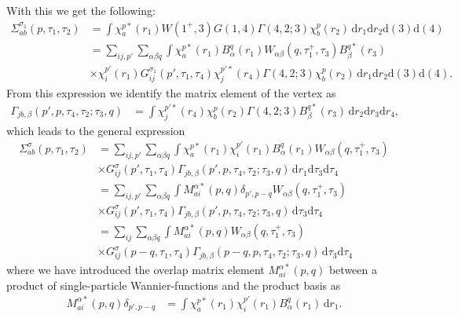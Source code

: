 \documentclass[12pt,a4paper]{scrartcl}
\numberwithin{equation}{section}
\begin{document}
With this we get the following:
\begin{align}
\Sigma^{\sigma_1}_{ab}(p,\tau_1,\tau_2)
&= \int \chi^{p*}_{a}(r_1) W(1^+,3) G(1,4) \Gamma(4,2;3) \chi^p_{b}(r_2) 
                                             \,\mathrm{d}r_1\mathrm{d}r_2 \mathrm{d}(3)\mathrm{d}(4) \\
%
&= \sum_{ij,p'}\sum_{\alpha\beta q}
   \int \chi^{p*}_{a}(r_1) B^q_{\alpha}(r_1) W_{\alpha\beta}(q,\tau_1^+,\tau_3) B^{q*}_{\beta}(r_3) \nonumber\\
  &\times \chi^{p'}_{i}(r_1) G^{\sigma_1}_{ij}(p',\tau_1,\tau_4) \chi^{p'*}_{j}(r_4)
   \Gamma(4,2;3) \chi^{p}_{b}(r_2) \,\mathrm{d}r_1\mathrm{d}r_2 \mathrm{d}(3)\mathrm{d}(4) .
\end{align}
From this expression we identify the matrix element of the 
vertex as
\begin{align}
\Gamma_{jb,\beta}(p',p,\tau_4,\tau_2;\tau_3,q)
&= \int \chi^{p'*}_{j}(r_4) \chi^p_{b}(r_2) \Gamma(4,2;3) B^{q*}_{\beta}(r_3)
    \,\mathrm{d}r_2\mathrm{d}r_3 \mathrm{d}r_4,
\end{align}
which leads to the general expression
\begin{align}
\Sigma^{\sigma}_{ab}(p,\tau_1,\tau_2)
%
&= \sum_{ij,p'}\sum_{\alpha\beta q}
   \int \chi^{p*}_{a}(r_1) \chi^{p'}_{i}(r_1) B^q_{\alpha}(r_1)
     W_{\alpha\beta}(q,\tau_1^+,\tau_3)  \nonumber\\
  &\times  G^{\sigma}_{ij}(p',\tau_1,\tau_4) 
   \Gamma_{jb,\beta}(p',p,\tau_4,\tau_2;\tau_3,q) \,\mathrm{d}r_1 \mathrm{d}\tau_3\mathrm{d}\tau_4 \\
%
&= \sum_{ij,p'}\sum_{\alpha\beta q}
   \int M^{\alpha*}_{ai}(p,q) \delta_{p',p-q}
     W_{\alpha\beta}(q,\tau_1^+,\tau_3)  \nonumber\\
  &\times  G^{\sigma}_{ij}(p',\tau_1,\tau_4) 
   \Gamma_{jb,\beta}(p',p,\tau_4,\tau_2;\tau_3,q) \, \mathrm{d}\tau_3\mathrm{d}\tau_4  \\
%
&= \sum_{ij}\sum_{\alpha\beta q}
   \int M^{\alpha*}_{ai}(p,q) 
     W_{\alpha\beta}(q,\tau_1^+,\tau_3)  \nonumber\\
  &\times  G^{\sigma}_{ij}(p-q,\tau_1,\tau_4) 
   \Gamma_{jb,\beta}(p-q,p,\tau_4,\tau_2;\tau_3,q) \, \mathrm{d}\tau_3\mathrm{d}\tau_4
\end{align}
where we have introduced the overlap matrix element $M^{\alpha*}_{ai}(p,q) $
between a product of single-particle Wannier-functions
and the product basis as
\begin{align}
 M^{\alpha*}_{ai}(p,q) \delta_{p',p-q}
 &= \int \chi^{p*}_{a}(r_1) \chi^{p'}_{i}(r_1) B^q_{\alpha}(r_1) \, \mathrm{d}r_1.
\end{align}
\end{document}
